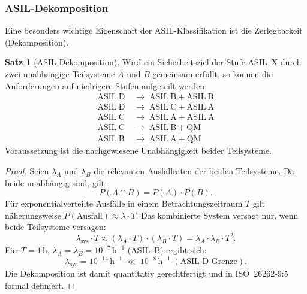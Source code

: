 ﻿\documentclass[a4paper,12pt]{article}
\theoremstyle{definition}
\newtheorem{satz}{Satz}
\begin{document}
\subsubsection{ASIL-Dekomposition}

Eine besonders wichtige Eigenschaft der ASIL-Klassifikation ist die
Zerlegbarkeit (Dekomposition).

\begin{satz}[ASIL-Dekomposition]
\label{satz:dekomposition}
  Wird ein Sicherheitsziel der Stufe ASIL~X durch zwei unabhängige
  Teilsysteme $A$ und $B$ gemeinsam erfüllt, so können die Anforderungen
  auf niedrigere Stufen aufgeteilt werden:
  \begin{align*}
    \mathrm{ASIL~D} &\;\rightarrow\; \mathrm{ASIL~B} + \mathrm{ASIL~B}\\
    \mathrm{ASIL~D} &\;\rightarrow\; \mathrm{ASIL~C} + \mathrm{ASIL~A}\\
    \mathrm{ASIL~C} &\;\rightarrow\; \mathrm{ASIL~A} + \mathrm{ASIL~A}\\
    \mathrm{ASIL~C} &\;\rightarrow\; \mathrm{ASIL~B} + \mathrm{QM}\\
    \mathrm{ASIL~B} &\;\rightarrow\; \mathrm{ASIL~A} + \mathrm{QM}
  \end{align*}
  Voraussetzung ist die nachgewiesene Unabhängigkeit beider Teilsysteme.
\end{satz}

\begin{proof}
  Seien $\lambda_A$ und $\lambda_B$ die relevanten Ausfallraten der
  beiden Teilsysteme. Da beide unabhängig sind, gilt:
  \[
    P(A \cap B) = P(A) \cdot P(B).
  \]
  Für exponentialverteilte Ausfälle in einem Betrachtungszeitraum $T$
  gilt näherungsweise $P(\text{Ausfall}) \approx \lambda \cdot T$.
  Das kombinierte System versagt nur, wenn beide Teilsysteme versagen:
  \[
    \lambda_{\mathrm{sys}} \cdot T
    \approx (\lambda_A \cdot T) \cdot (\lambda_B \cdot T)
    = \lambda_A \cdot \lambda_B \cdot T^2.
  \]
  Für $T = 1\,\mathrm{h}$, $\lambda_A = \lambda_B = 10^{-7}\,\mathrm{h}^{-1}$
  (ASIL~B) ergibt sich:
  \[
    \lambda_{\mathrm{sys}} = 10^{-14}\,\mathrm{h}^{-1}
    \;\ll\; 10^{-8}\,\mathrm{h}^{-1}\;(\text{ASIL-D-Grenze}).
  \]
  Die Dekomposition ist damit quantitativ gerechtfertigt und in
  ISO~26262-9:5 formal definiert.
\end{proof}

\end{document}
